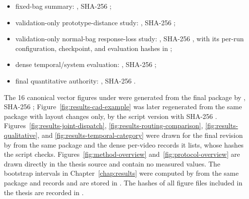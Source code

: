 \begin{itemize}
    \item fixed-bag summary: , SHA-256 ;
    \item validation-only prototype-distance study: , SHA-256 ;
    \item validation-only normal-bag response-loss study: , SHA-256 , with its per-run configuration, checkpoint, and evaluation hashes in ;
    \item dense temporal/system evaluation: , SHA-256 ;
    \item final quantitative authority: , SHA-256 .
\end{itemize}

The 16 canonical vector figures under  were generated from the final package by , SHA-256 ; Figure~\ref{fig:results-cad-example} was later regenerated from the same package with layout changes only, by the script version with SHA-256 . Figures~\ref{fig:results-joint-dispatch}, \ref{fig:results-routing-comparison}, \ref{fig:results-qualitative}, and \ref{fig:results-temporal-category} were drawn for the final revision by  from the same package and the dense per-video records it lists, whose hashes the script checks. Figures~\ref{fig:method-overview} and~\ref{fig:protocol-overview} are drawn directly in the thesis source and contain no measured values. The bootstrap intervals in Chapter~\ref{chap:results} were computed by  from the same package and records and are stored in . The hashes of all figure files included in the thesis are recorded in .

